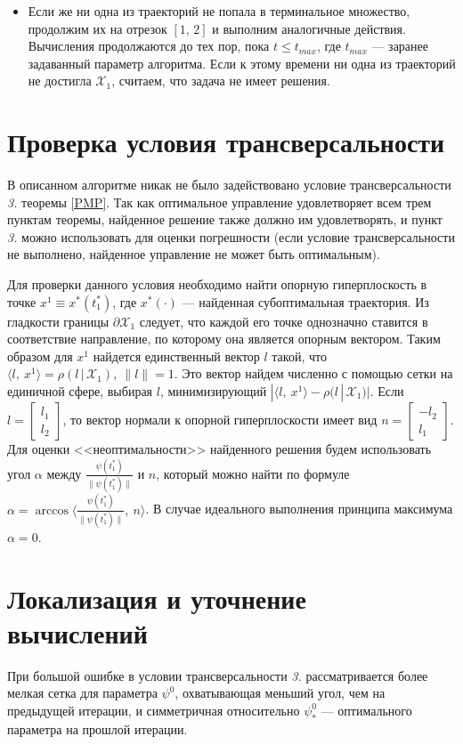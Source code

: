\documentclass[11pt]{article}
\newcommand\X{\mathcal{X}}
\newcommand\Sup[2]{\rho( #1 \, | \, #2 )}
\newcommand\Cl[2]{\begin{bmatrix}
#1 \\ #2
\end{bmatrix}}
\DeclareMathOperator{\Arccos}{arccos}
\begin{document}
\begin{itemize}
\item Если же ни одна из траекторий не попала в терминальное множество, продолжим их на отрезок
$[1, \, 2]$ и выполним аналогичные действия. Вычисления продолжаются до тех пор, пока $t \le t_{max}$,
где $t_{max}$ --- заранее задаванный параметр алгоритма. Если к этому времени ни одна из траекторий
не достигла $\X_1$, считаем, что задача не имеет решения.

\end{itemize}

\section{Проверка условия трансверсальности}
В описанном алгоритме никак не было задействовано условие трансверсальности \textit{3.} теоремы 
\ref{PMP}. Так как оптимальное управление удовлетворяет всем трем пунктам теоремы, найденное
решение также должно им удовлетворять, и пункт \textit{3.} можно использовать для оценки
погрешности (если условие трансверсальности не выполнено, найденное управление не может быть
оптимальным).

Для проверки данного условия необходимо найти опорную гиперплоскость в точке $x^1 \equiv x^*(t_1^*)$, 
где $x^*(\cdot)$ --- найденная субоптимальная траектория. Из гладкости границы $\partial \X_1$ 
следует, что
каждой его точке однозначно ставится в соответствие направление, по которому она
является опорным вектором. Таким образом для $x^1$
найдется единственный вектор $l$ такой, что $\langle l, \ x^1 \rangle = \Sup{l}{\X_1}, \ \|l\| = 1$.
Это вектор найдем численно с помощью сетки на единичной сфере, выбирая $l$, минимизирующий
 $|\langle l, \ x^1 \rangle - \Sup{l}{\X_1}|$. Если $l = \Cl{l_1}{l_2}$, то вектор нормали к опорной
 гиперплоскости имеет вид $n = \Cl{-l_2}{l_1}$. Для оценки <<неоптимальности>> найденного решения
 будем использовать угол $\alpha$ между $\frac{\psi(t_1^*)}{\|\psi(t_1^*)\|}$ и $n$, который можно
  найти по формуле $\alpha = \Arccos \langle \frac{\psi(t_1^*)}{\|\psi(t_1^*)\|}, \ n \rangle$.
  В случае идеального выполнения принципа максимума $\alpha = 0$.


\section{Локализация и уточнение вычислений}

При большой ошибке в условии трансверсальности \textit{3.} рассматривается более мелкая сетка для
параметра $\psi^0$, охватывающая меньший угол, чем на предыдущей итерации, и симметричная относительно
$\psi^0_*$ --- оптимального параметра на прошлой итерации.
\end{document}
